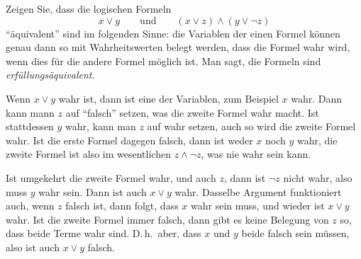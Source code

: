 Zeigen Sie, dass die logischen Formeln
\[
x\vee y\qquad\text{und}\qquad (x\vee z)\wedge (y\vee \neg z)
\]
``äquivalent'' sind im folgenden Sinne: die Variablen der einen Formel
können genau dann so mit Wahrheitswerten
belegt werden, dass die Formel wahr wird, wenn dies für die andere Formel
möglich ist.
Man sagt, die Formeln sind {\em erfüllungsäquivalent}.
%


\begin{loesung}
Wenn $x\vee y$ wahr ist, dann ist eine der Variablen, zum Beispiel
$x$ wahr.
Dann kann mann $z$ auf ``falsch'' setzen, was die zweite Formel wahr macht.
Ist stattdessen $y$ wahr, kann man $z$ auf wahr setzen, auch so wird die
zweite Formel wahr.
Ist die erste Formel dagegen falsch, dann ist weder $x$ noch $y$ wahr,
die zweite Formel ist also im wesentlichen $z\wedge \neg z$, was nie
wahr sein kann.

Ist umgekehrt die zweite Formel wahr, und auch $z$, dann ist $\neg z$ nicht 
wahr, also muss $y$ wahr sein. Dann ist auch $x\vee y$ wahr. Dasselbe
Argument funktioniert auch, wenn $z$ falsch ist, dann folgt, dass $x$
wahr sein muss, und wieder ist $x\vee y$ wahr.
Ist die zweite Formel immer falsch, dann gibt es keine Belegung von
$z$ so, dass beide Terme wahr sind.
D.\,h.~aber, dass $x$ und $y$ beide falsch sein müssen, also ist auch
$x\vee y$ falsch.


\end{loesung}
